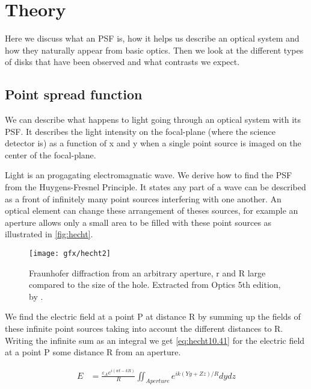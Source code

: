 
\chapter{Theory} %
\label{ch:theory} %
Here we discuss what an \ac{PSF} is, how it helps us describe an optical system and how they naturally appear from basic optics. Then we look at the different types of disks that have been observed and what contrasts we expect.
\section{Point spread function}
\label{sec:PSF}

We can describe what happens to light going through an optical system with its \ac{PSF}. It describes the light intensity on the focal-plane (where the science detector is) as a function of x and y when a single point source is imaged on the center of the focal-plane. 

Light is an progagating electromagnatic wave. We derive how to find the \ac{PSF} from the Huygens-Fresnel Principle. It states any part of a wave can be described as a front of infinitely many point sources interfering with one another. An optical element can change these arrangement of theses sources, for example an aperture allows only a small area to be filled with these point sources as illustrated in \autoref{fig:hecht}. 

\begin{figure}[h]
    \caption{Fraunhofer diffraction from an arbitrary aperture, r and R large compared to the size of the hole. Extracted from Optics 5th edition, by \cite{hecht}.}
    \centering
    \texttt{[image: gfx/hecht2]}
    \label{fig:hecht}
\end{figure}

We find the electric field at a point P at distance R by summing up the fields of these infinite point sources taking into account the different distances to R. Writing the infinite sum as an integral we get \autoref{eq:hecht10.41} for the electric field at a point P some distance R from an aperture.

\begin{subequations}
    \begin{align}
        E &= \frac{\varepsilon_A e^{i(wt-kR)}}{R} \iint_{Aperture} e^{ik(Yy+Zz)/R} dydz
    \end{align}
    \label{eq:hecht10.41}
\end{subequations}

